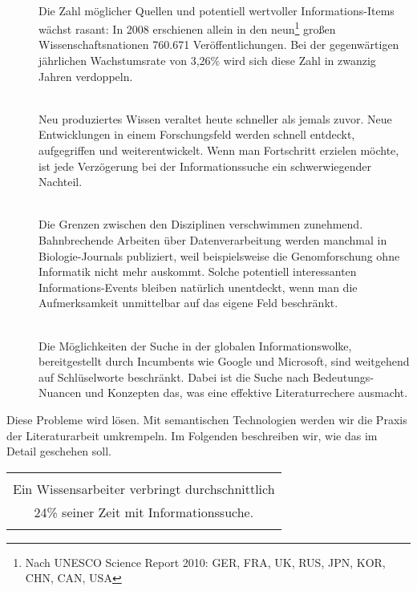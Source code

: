 \begin{description}
  \item[\textbf{\color{orange}{Informationsuniversum wächst:}}] \hfill \\
  Die Zahl möglicher Quellen und potentiell wertvoller Informations-Items wächst rasant: 
In 2008 erschienen allein in den neun\footnote[2]{Nach UNESCO Science Report 2010: GER, FRA, UK, RUS, JPN, KOR, CHN, CAN, USA} großen Wissenschaftsnationen 760.671 Veröffentlichungen. Bei der gegenwärtigen jährlichen Wachstumsrate von 3,26\% wird sich diese Zahl in zwanzig Jahren verdoppeln. 
  \item[\textbf{\color{orange}{Information veraltet:}}] \hfill \\
  Neu produziertes Wissen veraltet heute schneller als jemals zuvor. Neue Entwicklungen in einem Forschungsfeld werden schnell entdeckt, aufgegriffen und weiterentwickelt. Wenn man Fortschritt erzielen möchte, ist jede Verzögerung bei der Informationssuche ein schwerwiegender Nachteil. 
  \item[\textbf{\color{orange}{Wissensgebiete werden vernetzt:}}] \hfill \\
  Die Grenzen zwischen den Disziplinen verschwimmen zunehmend. Bahnbrechende Arbeiten über Datenverarbeitung werden manchmal in Biologie-Journals publiziert, weil beispielsweise die Genomforschung ohne Informatik nicht mehr auskommt. Solche potentiell interessanten Informations-Events bleiben natürlich unentdeckt, wenn man die Aufmerksamkeit unmittelbar auf das eigene Feld beschränkt. 
 \item[\textbf{\color{orange}{Verfügbare Such-Tools sind unzulänglich:}}] \hfill \\
	Die Möglichkeiten der Suche in der globalen Informationswolke, bereitgestellt durch Incumbents wie Google und Microsoft, sind weitgehend auf Schlüselworte beschränkt. Dabei ist die Suche nach Bedeutungs-Nuancen und Konzepten das, was eine effektive Literaturrechere ausmacht. 
\end{description} Diese Probleme wird \textsc{\color{orange}{SemLit}} lösen. Mit semantischen Technologien werden wir die Praxis der Literaturarbeit umkrempeln. Im Folgenden beschreiben wir, wie das im Detail geschehen soll. 

\begin{table}[h!]
  \centering
  \begin{large}
	\begin{itshape}
  \begin{tabular}{c}\hline
  \\
  {\color{orange}Ein Wissensarbeiter verbringt durchschnittlich }\\
  {\color{orange}24\% seiner Zeit mit Informationssuche.}\\
  \\\hline
  \end{tabular}
	\end{itshape}
  \end{large}
\end{table}


